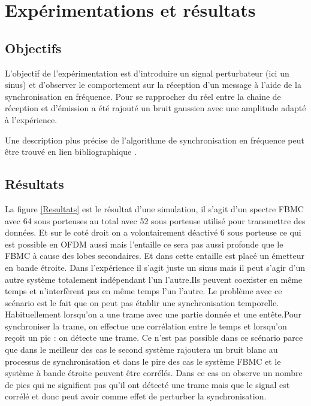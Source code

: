 \documentclass[conference]{IEEEtran}
\begin{document}
\section{Expérimentations et résultats}

\subsection{Objectifs}

L'objectif de l'expérimentation est d'introduire un signal perturbateur (ici un sinus) et d'observer le comportement sur la réception d'un message à l'aide de la synchronisation en fréquence.
Pour se rapprocher du réel entre la chaine de réception et d'émission a été rajouté un bruit gaussien avec une amplitude adapté à l'expérience.

Une description plus précise de l'algorithme de synchronisation en fréquence peut être trouvé en lien bibliographique \cite{b2}.

\subsection{Résultats}
 
 La figure \ref{Resultats} est le résultat d'une simulation, il s'agit d'un spectre FBMC avec 64 sous porteuses au total avec 52 sous porteuse utilisé pour transmettre des données. Et sur le coté droit on a volontairement déactivé 6 sous porteuse ce qui est possible en OFDM aussi mais l’entaille ce sera pas aussi profonde que le FBMC à cause des lobes secondaires. Et dans cette entaille est placé un émetteur en bande étroite. Dans l'expérience il s'agit juste un sinus mais il peut s’agir d’un autre système totalement indépendant l’un l’autre.Ils peuvent coexister en même temps et n’interfèrent pas en même temps l’un l’autre. Le problème avec ce scénario est le fait que on peut pas établir une synchronisation temporelle. Habituellement lorsqu’on a une trame avec une partie donnée et une entête.Pour synchroniser la trame, on effectue une corrélation entre le temps et lorsqu’on reçoit un pic : on détecte une trame. Ce n’est pas possible dans ce scénario parce que dans le meilleur des cas le second système rajoutera un bruit blanc au processus de synchronisation et dans le pire des cas le système FBMC et le système à bande étroite peuvent être corrélés. Dans ce cas on observe un nombre de pics qui ne signifient pas qu’il ont détecté une trame mais que le signal est corrélé et donc peut avoir comme effet de perturber la synchronisation.
 
\end{document}
